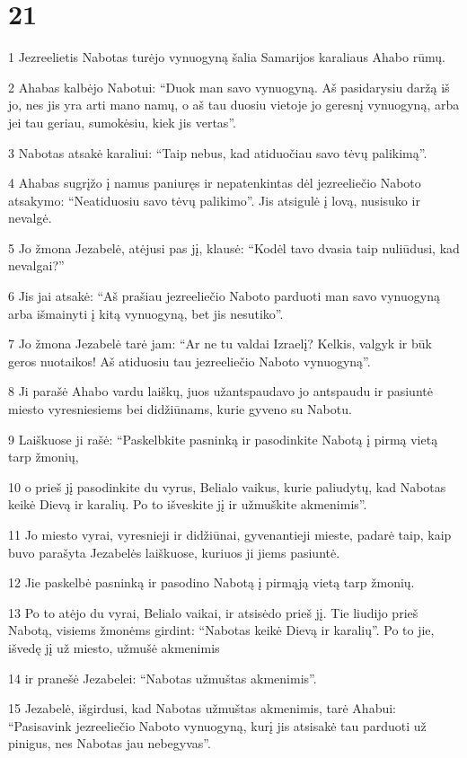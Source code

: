 \chapter{21}

\par 1 Jezreelietis Nabotas turėjo vynuogyną šalia Samarijos karaliaus Ahabo rūmų. 
\par 2 Ahabas kalbėjo Nabotui: “Duok man savo vynuogyną. Aš pasidarysiu daržą iš jo, nes jis yra arti mano namų, o aš tau duosiu vietoje jo geresnį vynuogyną, arba jei tau geriau, sumokėsiu, kiek jis vertas”. 
\par 3 Nabotas atsakė karaliui: “Taip nebus, kad atiduočiau savo tėvų palikimą”. 
\par 4 Ahabas sugrįžo į namus paniuręs ir nepatenkintas dėl jezreeliečio Naboto atsakymo: “Neatiduosiu savo tėvų palikimo”. Jis atsigulė į lovą, nusisuko ir nevalgė. 
\par 5 Jo žmona Jezabelė, atėjusi pas jį, klausė: “Kodėl tavo dvasia taip nuliūdusi, kad nevalgai?” 
\par 6 Jis jai atsakė: “Aš prašiau jezreeliečio Naboto parduoti man savo vynuogyną arba išmainyti į kitą vynuogyną, bet jis nesutiko”. 
\par 7 Jo žmona Jezabelė tarė jam: “Ar ne tu valdai Izraelį? Kelkis, valgyk ir būk geros nuotaikos! Aš atiduosiu tau jezreeliečio Naboto vynuogyną”. 
\par 8 Ji parašė Ahabo vardu laiškų, juos užantspaudavo jo antspaudu ir pasiuntė miesto vyresniesiems bei didžiūnams, kurie gyveno su Nabotu. 
\par 9 Laiškuose ji rašė: “Paskelbkite pasninką ir pasodinkite Nabotą į pirmą vietą tarp žmonių, 
\par 10 o prieš jį pasodinkite du vyrus, Belialo vaikus, kurie paliudytų, kad Nabotas keikė Dievą ir karalių. Po to išveskite jį ir užmuškite akmenimis”. 
\par 11 Jo miesto vyrai, vyresnieji ir didžiūnai, gyvenantieji mieste, padarė taip, kaip buvo parašyta Jezabelės laiškuose, kuriuos ji jiems pasiuntė. 
\par 12 Jie paskelbė pasninką ir pasodino Nabotą į pirmąją vietą tarp žmonių. 
\par 13 Po to atėjo du vyrai, Belialo vaikai, ir atsisėdo prieš jį. Tie liudijo prieš Nabotą, visiems žmonėms girdint: “Nabotas keikė Dievą ir karalių”. Po to jie, išvedę jį už miesto, užmušė akmenimis 
\par 14 ir pranešė Jezabelei: “Nabotas užmuštas akmenimis”. 
\par 15 Jezabelė, išgirdusi, kad Nabotas užmuštas akmenimis, tarė Ahabui: “Pasisavink jezreeliečio Naboto vynuogyną, kurį jis atsisakė tau parduoti už pinigus, nes Nabotas jau nebegyvas”. 
